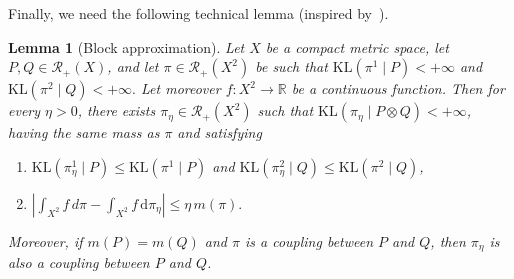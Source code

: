 \documentclass{article}
\theoremstyle{plain}
\newtheorem{lemma}[theorem]{Lemma}
\theoremstyle{definition}
\theoremstyle{remark}
\begin{document}
Finally, we need the following technical lemma (inspired by~\cite[Lemma~5.3]{nutz2021introduction}).

\begin{lemma}[Block approximation]\label{lem:block}
Let \(X\) be a compact metric space, let \(P,Q \in \mathcal{R}_{+}(X)\), and let
$\pi \in \mathcal{R}_{+}(X^2)$
be such that $\mathrm{KL}(\pi^1\mid P)<+\infty$ and $\mathrm{KL}(\pi^2\mid Q)<+\infty.$
Let moreover $f:X^2 \rightarrow \mathbb{R}$ be a continuous function. Then for every \(\eta>0\), there exists $\pi_\eta \in \mathcal{R}_{+}(X^2)$
such that $\mathrm{KL}(\pi_\eta\mid P\otimes Q)<+\infty$, having the same mass as $\pi$ and satisfying
\begin{enumerate}
\item $\mathrm{KL}(\pi_\eta^1\mid P) \le \mathrm{KL}(\pi^1\mid P)$ and $\mathrm{KL}(\pi_\eta^2\mid Q)
\le
\mathrm{KL}(\pi^2\mid Q)$,
\item $
\left|
\int_{X^2} f\, d\pi
-
\int_{X^2} f\, \mathrm{d}\pi_\eta
\right|
\le \eta\, m(\pi).$
\end{enumerate}

Moreover, if \(m(P)=m(Q)\) and \(\pi\) is a coupling between \(P\) and \(Q\), then \(\pi_\eta\) is also a coupling between \(P\) and \(Q\).

\end{lemma}
\end{document}
